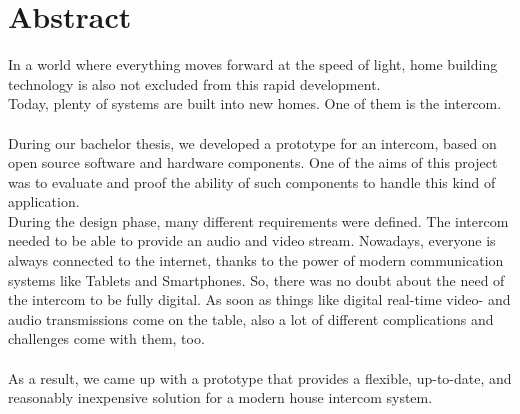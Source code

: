 \section*{Abstract}
\label{sec:abstract}

In a world where everything moves forward at the speed of light, home building technology is also not excluded from this rapid development. 
\\
Today, plenty of systems are built into new homes. One of them is the intercom. 
\\
\\
During our bachelor thesis, we developed a prototype for an intercom, based on open source software and hardware components. One of the aims of this project was to evaluate and proof the ability of such components to handle this kind of application. 
\\
During the design phase, many different requirements were defined. The intercom needed to be able to provide an audio and video stream. Nowadays, everyone is always connected to the internet, thanks to the power of modern communication systems like Tablets and Smartphones. So, there was no doubt about the need of the intercom to be fully digital. As soon as things like digital real-time video- and audio transmissions come on the table, also a lot of different complications and challenges come with them, too. 
\\
\\
As a result, we came up with a prototype that provides a flexible, up-to-date, and reasonably inexpensive solution for a modern house intercom system. 
